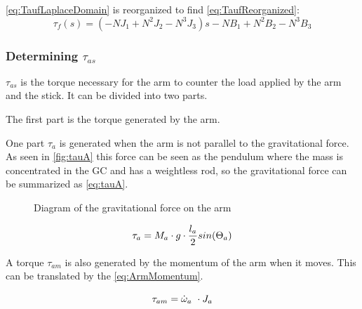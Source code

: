 \autoref{eq:TaufLaplaceDomain} is reorganized to find \autoref{eq:TaufReorganized}:
\begin{equation}
	\tau_f(s) = (-N J_1 + N^2 J_2 - N^3 J_3)s - N B_1 + N^2 B_2 - N^3 B_3
	\label{eq:TaufReorganized}
\end{equation}











\subsubsection*{Determining $\tau_{as}$}

$\tau_{as}$ is the torque necessary for the arm to counter the load applied by the arm and the stick. It can be divided into two parts.

The first part is the torque generated by the arm.

 One part $\tau_a$ is generated when the arm is not parallel to the gravitational force. As seen in \autoref{fig:tauA} this force can be seen as the pendulum where the mass is concentrated in the GC and has a weightless rod, so the gravitational force can be summarized as \autoref{eq:tauA}.

\begin{figure}[htbp]
	\caption{Diagram of the gravitational force on the arm}\label{fig:tauA}
\end{figure}

\begin{equation}\label{eq:tauA}
	\tau_a=M_a\cdot g \cdot \frac{l_a}{2} sin(\Theta_a) \addunit{\newton\meter}
\end{equation}
\startexplain
{}
\stopexplain

A torque $\tau_{am}$ is also generated by the momentum of the arm when it moves. This can be translated by the \autoref{eq:ArmMomentum}.

\begin{equation}\label{eq:ArmMomentum}
	\tau_{am}=\dot\omega_a\ \cdot J_a \addunit{\newton\meter}
\end{equation}
\startexplain
{}
\stopexplain

